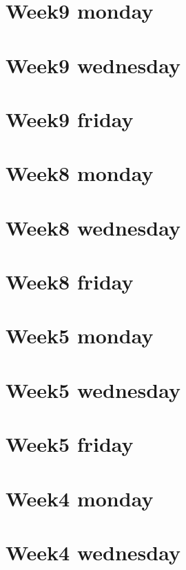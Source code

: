 
\section*{Week9 monday}

\vfill
\section*{Week9 wednesday}

\vfill
\section*{Week9 friday}

\vfill
\section*{Week8 monday}

\vfill
\section*{Week8 wednesday}

\vfill
\section*{Week8 friday}

\vfill
\section*{Week5 monday}

\vfill
\section*{Week5 wednesday}

\vfill
\section*{Week5 friday}

\vfill
\section*{Week4 monday}

\vfill
\section*{Week4 wednesday}

\vfill
